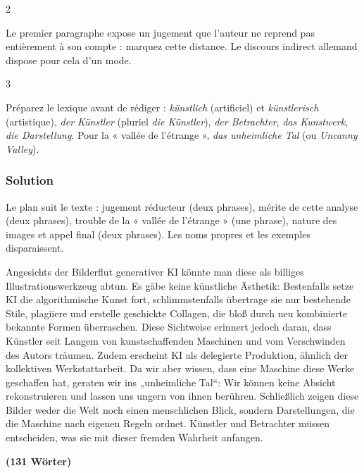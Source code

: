 \documentclass[11pt,a4paper]{article}
\begin{document}
\begin{indication}{2}

Le premier paragraphe expose un jugement que l'auteur ne reprend pas entièrement à son compte : marquez cette distance. Le discours indirect allemand dispose pour cela d'un mode.

\end{indication}

\begin{indication}{3}

Préparez le lexique avant de rédiger : \emph{künstlich} (artificiel) et \emph{künstlerisch} (artistique), \emph{der Künstler} (pluriel \emph{die Künstler}), \emph{der Betrachter}, \emph{das Kunstwerk}, \emph{die Darstellung}. Pour la « vallée de l'étrange », \emph{das unheimliche Tal} (ou \emph{Uncanny Valley}).

\end{indication}

\hypertarget{solution}{%
\subsubsection{Solution}\label{solution}}

Le plan suit le texte : jugement réducteur (deux phrases), mérite de cette analyse (deux phrases), trouble de la « vallée de l'étrange » (une phrase), nature des images et appel final (deux phrases). Les noms propres et les exemples disparaissent.

Angesichts der Bilderflut generativer KI könnte man diese als billiges Illustrationswerkzeug abtun. Es gäbe keine künstliche Ästhetik: Bestenfalls setze KI die algorithmische Kunst fort, schlimmstenfalls übertrage sie nur bestehende Stile, plagiiere und erstelle geschickte Collagen, die bloß durch neu kombinierte bekannte Formen überraschen. Diese Sichtweise erinnert jedoch daran, dass Künstler seit Langem von kunstschaffenden Maschinen und vom Verschwinden des Autors träumen. Zudem erscheint KI als delegierte Produktion, ähnlich der kollektiven Werkstattarbeit. Da wir aber wissen, dass eine Maschine diese Werke geschaffen hat, geraten wir ins „unheimliche Tal``: Wir können keine Absicht rekonstruieren und lassen uns ungern von ihnen berühren. Schließlich zeigen diese Bilder weder die Welt noch einen menschlichen Blick, sondern Darstellungen, die die Maschine nach eigenen Regeln ordnet. Künstler und Betrachter müssen entscheiden, was sie mit dieser fremden Wahrheit anfangen.

\textbf{(131 Wörter)}
\end{document}
